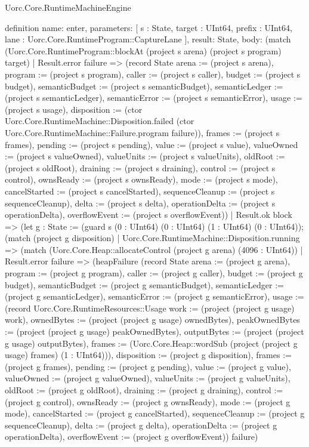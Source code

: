 \begin{lexlean}{Uorc.Core.RuntimeMachineEngine}
\begin{semanticmodule}
definition{
  name: enter,
  parameters: [
    s : State,
    target : UInt64,
    prefix : UInt64,
    lane : Uorc.Core.RuntimeProgram::CaptureLane
  ],
  result: State,
  body: (match (Uorc.Core.RuntimeProgram::blockAt (project s arena) (project s program) target)
    | Result.error failure => (record State {arena := (project s arena), program := (project s program), caller := (project s caller), budget := (project s budget), semanticBudget := (project s semanticBudget), semanticLedger := (project s semanticLedger), semanticError := (project s semanticError), usage := (project s usage), disposition := (ctor Uorc.Core.RuntimeMachine::Disposition.failed (ctor Uorc.Core.RuntimeMachine::Failure.program failure)), frames := (project s frames), pending := (project s pending), value := (project s value), valueOwned := (project s valueOwned), valueUnits := (project s valueUnits), oldRoot := (project s oldRoot), draining := (project s draining), control := (project s control), ownsReady := (project s ownsReady), mode := (project s mode), cancelStarted := (project s cancelStarted), sequenceCleanup := (project s sequenceCleanup), delta := (project s delta), operationDelta := (project s operationDelta), overflowEvent := (project s overflowEvent)})
    | Result.ok block => (let g : State := (guard s (0 : UInt64) (0 : UInt64) (1 : UInt64) (0 : UInt64)); (match (project g disposition)
      | Uorc.Core.RuntimeMachine::Disposition.running => (match (Uorc.Core.Heap::allocateControl (project g arena) (4096 : UInt64))
        | Result.error failure => (heapFailure (record State {arena := (project g arena), program := (project g program), caller := (project g caller), budget := (project g budget), semanticBudget := (project g semanticBudget), semanticLedger := (project g semanticLedger), semanticError := (project g semanticError), usage := (record Uorc.Core.RuntimeResources::Usage {work := (project (project g usage) work), ownedBytes := (project (project g usage) ownedBytes), peakOwnedBytes := (project (project g usage) peakOwnedBytes), outputBytes := (project (project g usage) outputBytes), frames := (Uorc.Core.Heap::wordSub (project (project g usage) frames) (1 : UInt64))}), disposition := (project g disposition), frames := (project g frames), pending := (project g pending), value := (project g value), valueOwned := (project g valueOwned), valueUnits := (project g valueUnits), oldRoot := (project g oldRoot), draining := (project g draining), control := (project g control), ownsReady := (project g ownsReady), mode := (project g mode), cancelStarted := (project g cancelStarted), sequenceCleanup := (project g sequenceCleanup), delta := (project g delta), operationDelta := (project g operationDelta), overflowEvent := (project g overflowEvent)}) failure)
}
\end{semanticmodule}
\end{lexlean}
